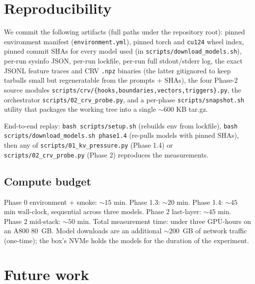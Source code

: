 \documentclass[11pt,letterpaper]{article}
\begin{document}
\section{Reproducibility}
\label{sec:repro}

We commit the following artifacts (full paths under the repository
root): pinned environment manifest (\verb|environment.yml|), pinned
torch and \texttt{cu124} wheel index, pinned commit SHAs for every
model used (in \verb|scripts/download_models.sh|), per-run
sysinfo JSON, per-run lockfile, per-run full stdout/stderr log, the
exact JSONL feature traces and CRV \verb|.npz| binaries (the latter
gitignored to keep tarballs small but regeneratable from the prompts +
SHAs), the four Phase-2 source modules
\verb|scripts/crv/{hooks,boundaries,vectors,triggers}.py|, the
orchestrator \verb|scripts/02_crv_probe.py|, and a per-phase
\verb|scripts/snapshot.sh| utility that packages the working tree into
a single $\sim 600$ KB tar.gz.

End-to-end replay: \verb|bash scripts/setup.sh| (rebuilds env from
lockfile), \verb|bash scripts/download_models.sh phase1.4| (re-pulls
models with pinned SHAs), then any of \verb|scripts/01_kv_pressure.py|
(Phase 1.4) or \verb|scripts/02_crv_probe.py| (Phase 2) reproduces the
measurements.

\subsection{Compute budget}

Phase 0 environment + smoke: $\sim 15$ min. Phase 1.3:
$\sim 20$ min. Phase 1.4: $\sim 45$ min wall-clock, sequential
across three models. Phase 2 last-layer: $\sim 45$ min. Phase 2
mid-stack: $\sim 50$ min. Total measurement time: under three GPU-hours
on an A800 80~GB. Model downloads are an additional $\sim 200$~GB of
network traffic (one-time); the box's NVMe holds the models for the
duration of the experiment.

\section{Future work}
\label{sec:future}
\end{document}
